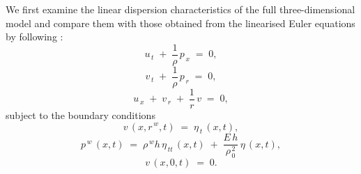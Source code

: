 \documentclass[alpha-refs, 12pt]{wiley-article}
\begin{document}
We first examine the linear dispersion characteristics of the full three-dimensional model and compare them with those obtained from the linearised Euler equations by following \cite{Mitsotakis2018}:
\begin{equation}\label{eq:lin_u}
  u_{\,t}\;+\;\frac{1}{\rho}\,p_{\,x}\;=\;0,
\end{equation}
\begin{equation}\label{eq:lin_v}
  v_{\,t}\;+\;\frac{1}{\rho}\,p_{\,r}\;=\;0,
\end{equation}
\begin{equation}\label{eq:lin_cont}
  u_{\,x}\;+\;v_{\,r}\;+\;\frac{1}{r}\,v\;=\;0,
\end{equation}
subject to the boundary conditions
\begin{equation}\label{eq:lin_bc_kin}
  v\,\left(x,r^{\,w},t\right)\;=\;\eta_{\,t}\,\left(x,t\right), 
\end{equation}
\begin{equation}\label{eq:lin_bc_dyn}
  p^{\,w}\,\left(x,t\right)\; = \;\rho^{\,w}h\,\eta_{\,tt}\,\left(x,t\right)\; + \;\frac{E\,h}{\rho_{\,0}^{\,2}}\,
  \eta\,\left(x,t\right),
\end{equation}
\begin{equation}\label{eq:lin_bc_axis}
  v\,\left(x,0,t\right)\; = \;0.
\end{equation}
\end{document}
